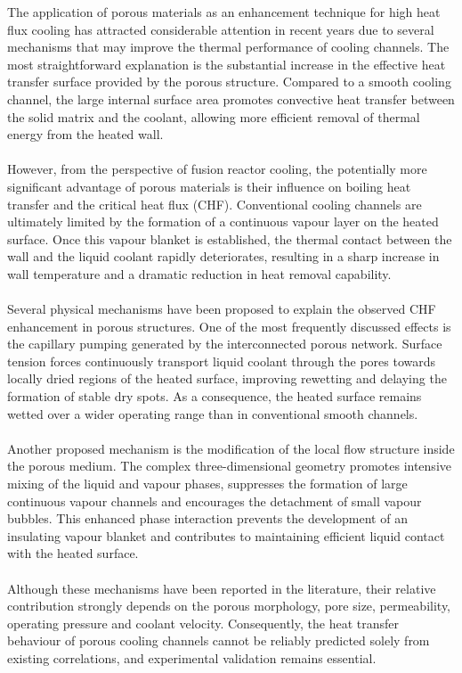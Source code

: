 \documentclass[a4paper]{article}
\begin{document}
The application of porous materials as an enhancement technique for high heat flux cooling has attracted considerable attention in recent years due to several mechanisms that may improve the thermal performance of cooling channels. The most straightforward explanation is the substantial increase in the effective heat transfer surface provided by the porous structure. Compared to a smooth cooling channel, the large internal surface area promotes convective heat transfer between the solid matrix and the coolant, allowing more efficient removal of thermal energy from the heated wall.
\\
\\
However, from the perspective of fusion reactor cooling, the potentially more significant advantage of porous materials is their influence on boiling heat transfer and the critical heat flux (CHF). Conventional cooling channels are ultimately limited by the formation of a continuous vapour layer on the heated surface. Once this vapour blanket is established, the thermal contact between the wall and the liquid coolant rapidly deteriorates, resulting in a sharp increase in wall temperature and a dramatic reduction in heat removal capability.
\\
\\
Several physical mechanisms have been proposed to explain the observed CHF enhancement in porous structures. One of the most frequently discussed effects is the capillary pumping generated by the interconnected porous network. Surface tension forces continuously transport liquid coolant through the pores towards locally dried regions of the heated surface, improving rewetting and delaying the formation of stable dry spots. As a consequence, the heated surface remains wetted over a wider operating range than in conventional smooth channels.
\\
\\
Another proposed mechanism is the modification of the local flow structure inside the porous medium. The complex three-dimensional geometry promotes intensive mixing of the liquid and vapour phases, suppresses the formation of large continuous vapour channels and encourages the detachment of small vapour bubbles. This enhanced phase interaction prevents the development of an insulating vapour blanket and contributes to maintaining efficient liquid contact with the heated surface.
\\
\\
Although these mechanisms have been reported in the literature, their relative contribution strongly depends on the porous morphology, pore size, permeability, operating pressure and coolant velocity. Consequently, the heat transfer behaviour of porous cooling channels cannot be reliably predicted solely from existing correlations, and experimental validation remains essential.
\end{document}
